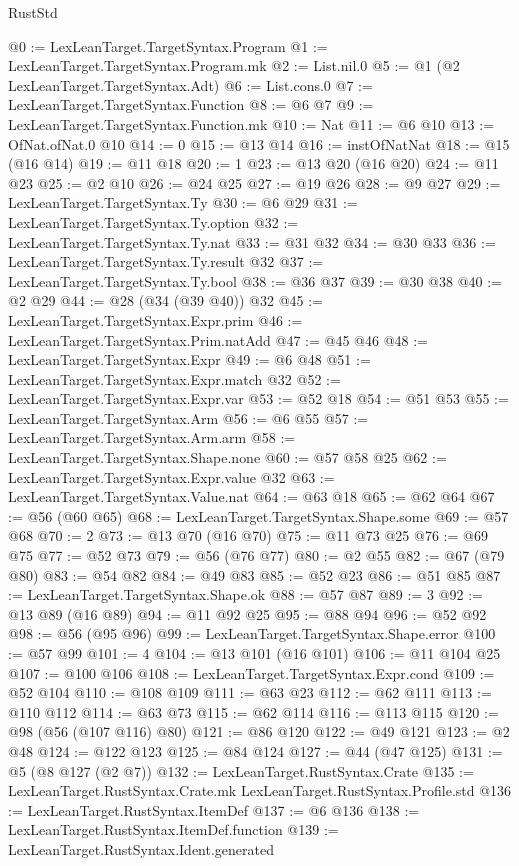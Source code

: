 \begin{lexlean}{RustStd}
\begin{coremodule}
@0 := LexLeanTarget.TargetSyntax.Program
@1 := LexLeanTarget.TargetSyntax.Program.mk
@2 := List.nil.{0}
@5 := @1 (@2 LexLeanTarget.TargetSyntax.Adt)
@6 := List.cons.{0}
@7 := LexLeanTarget.TargetSyntax.Function
@8 := @6 @7
@9 := LexLeanTarget.TargetSyntax.Function.mk
@10 := Nat
@11 := @6 @10
@13 := OfNat.ofNat.{0} @10
@14 := 0
@15 := @13 @14
@16 := instOfNatNat
@18 := @15 (@16 @14)
@19 := @11 @18
@20 := 1
@23 := @13 @20 (@16 @20)
@24 := @11 @23
@25 := @2 @10
@26 := @24 @25
@27 := @19 @26
@28 := @9 @27
@29 := LexLeanTarget.TargetSyntax.Ty
@30 := @6 @29
@31 := LexLeanTarget.TargetSyntax.Ty.option
@32 := LexLeanTarget.TargetSyntax.Ty.nat
@33 := @31 @32
@34 := @30 @33
@36 := LexLeanTarget.TargetSyntax.Ty.result @32
@37 := LexLeanTarget.TargetSyntax.Ty.bool
@38 := @36 @37
@39 := @30 @38
@40 := @2 @29
@44 := @28 (@34 (@39 @40)) @32
@45 := LexLeanTarget.TargetSyntax.Expr.prim
@46 := LexLeanTarget.TargetSyntax.Prim.natAdd
@47 := @45 @46
@48 := LexLeanTarget.TargetSyntax.Expr
@49 := @6 @48
@51 := LexLeanTarget.TargetSyntax.Expr.match @32
@52 := LexLeanTarget.TargetSyntax.Expr.var
@53 := @52 @18
@54 := @51 @53
@55 := LexLeanTarget.TargetSyntax.Arm
@56 := @6 @55
@57 := LexLeanTarget.TargetSyntax.Arm.arm
@58 := LexLeanTarget.TargetSyntax.Shape.none
@60 := @57 @58 @25
@62 := LexLeanTarget.TargetSyntax.Expr.value @32
@63 := LexLeanTarget.TargetSyntax.Value.nat
@64 := @63 @18
@65 := @62 @64
@67 := @56 (@60 @65)
@68 := LexLeanTarget.TargetSyntax.Shape.some
@69 := @57 @68
@70 := 2
@73 := @13 @70 (@16 @70)
@75 := @11 @73 @25
@76 := @69 @75
@77 := @52 @73
@79 := @56 (@76 @77)
@80 := @2 @55
@82 := @67 (@79 @80)
@83 := @54 @82
@84 := @49 @83
@85 := @52 @23
@86 := @51 @85
@87 := LexLeanTarget.TargetSyntax.Shape.ok
@88 := @57 @87
@89 := 3
@92 := @13 @89 (@16 @89)
@94 := @11 @92 @25
@95 := @88 @94
@96 := @52 @92
@98 := @56 (@95 @96)
@99 := LexLeanTarget.TargetSyntax.Shape.error
@100 := @57 @99
@101 := 4
@104 := @13 @101 (@16 @101)
@106 := @11 @104 @25
@107 := @100 @106
@108 := LexLeanTarget.TargetSyntax.Expr.cond
@109 := @52 @104
@110 := @108 @109
@111 := @63 @23
@112 := @62 @111
@113 := @110 @112
@114 := @63 @73
@115 := @62 @114
@116 := @113 @115
@120 := @98 (@56 (@107 @116) @80)
@121 := @86 @120
@122 := @49 @121
@123 := @2 @48
@124 := @122 @123
@125 := @84 @124
@127 := @44 (@47 @125)
@131 := @5 (@8 @127 (@2 @7))
@132 := LexLeanTarget.RustSyntax.Crate
@135 := LexLeanTarget.RustSyntax.Crate.mk LexLeanTarget.RustSyntax.Profile.std
@136 := LexLeanTarget.RustSyntax.ItemDef
@137 := @6 @136
@138 := LexLeanTarget.RustSyntax.ItemDef.function
@139 := LexLeanTarget.RustSyntax.Ident.generated

\end{coremodule}
\end{lexlean}
